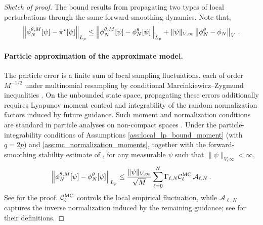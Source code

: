 \documentclass[11pt]{article}
\theoremstyle{plain}
\theoremstyle{definition}
\theoremstyle{remark}
\begin{document}
\begin{proof}[Sketch of proof]
The bound results from propagating two types of local perturbations through the same forward-smoothing dynamics. Note that,
$$
\left\|\mcfilter{N}[\psi]-\pi^\star[\psi]\right\|_{L_p}
\le \left\|\mcfilter{N}[\psi]-\approxfilter{N}[\psi]\right\|_{L_p}
+\|\psi\|_{V,\infty}\vnorm[\approxfilter{N}-\filter{N}][V] \eqsp.
$$
\paragraph{Particle approximation of the approximate model.} The particle error is a finite sum of local sampling fluctuations, each of order $M^{-1/2}$ under multinomial resampling by conditional Marcinkiewicz--Zygmund inequalities \citep{delmoral2004feynman}. On the unbounded state space, propagating these errors additionally requires Lyapunov moment control and integrability of the random normalization factors induced by future guidance. Such moment and normalization conditions are standard in particle analyses on non-compact spaces \citep{whiteley2012sequential}. Under the particle-integrability conditions of Assumptions \ref{ass:local_lp_bound_moment} (with $q=2p$) and \ref{ass:mc_normalization_moments}, together with the forward-smoothing stability estimate of , for any measurable $\psi$ such that $\|\psi\|_{V,\infty}<\infty$,
\begin{equation}
\label{eq:particle_error_main}
\left\| \mcfilter{N}[\psi]-\approxfilter{N}[\psi] \right\|_{L_p}
\le \frac{\|\psi\|_{V,\infty}}{\sqrt M} \sum_{\ell=0}^{N} \Gamma_{\ell,N} \mathcal{C}_\ell^{\rm MC}\, \mathcal A_{\ell,N}  \eqsp.
\end{equation}
See  for the proof. $\mathcal{C}_\ell^{\rm MC}$ controls the local empirical fluctuation, while $\mathcal A_{\ell,N}$ captures the inverse normalization induced by the remaining guidance; see  for their definitions.
%

\end{proof}
\end{document}
